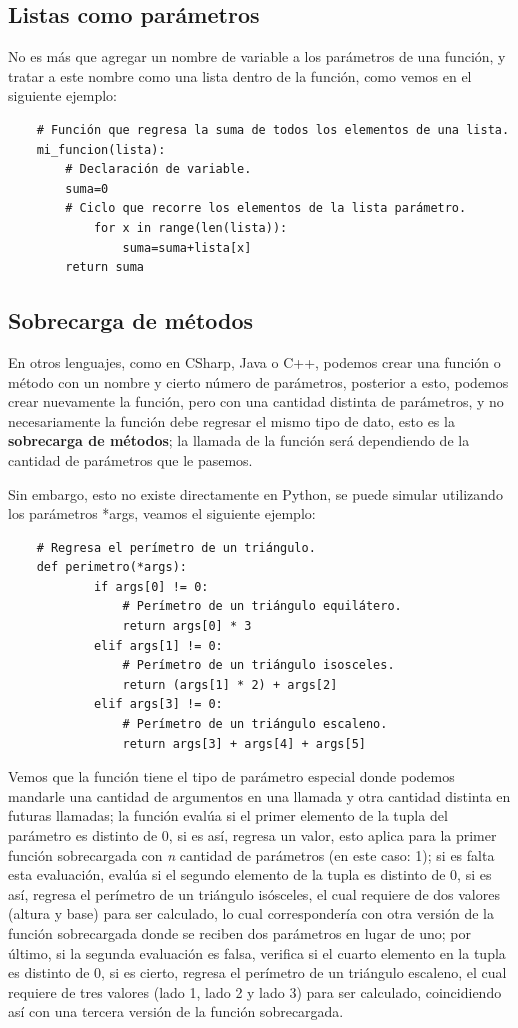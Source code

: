 \subsection{Listas como parámetros}
\hspace{0.55cm}No es más que agregar un nombre de variable a los parámetros de una función, y tratar a este nombre como una lista dentro de la función, como vemos en el siguiente ejemplo:
\begin{lstlisting}
	# Función que regresa la suma de todos los elementos de una lista.
	mi_funcion(lista):
		# Declaración de variable.
		suma=0
		# Ciclo que recorre los elementos de la lista parámetro.
    		for x in range(len(lista)):
        		suma=suma+lista[x]
   		return suma
\end{lstlisting}


\subsection{Sobrecarga de métodos}
\hspace{0.55cm}En otros lenguajes, como en CSharp, Java o C++, podemos crear una función o método con un nombre y cierto número de parámetros, posterior a esto, podemos crear nuevamente la función, pero con una cantidad distinta de parámetros, y no necesariamente la función debe regresar el mismo tipo de dato, esto es la \textbf{sobrecarga de métodos}; la llamada de la función será dependiendo de la cantidad de parámetros que le pasemos.

Sin embargo, esto no existe directamente en Python, se puede simular utilizando los parámetros *args, veamos el siguiente ejemplo:
\begin{lstlisting}
	# Regresa el perímetro de un triángulo.
	def perimetro(*args):
    		if args[0] != 0:
    			# Perímetro de un triángulo equilátero.
        		return args[0] * 3
    		elif args[1] != 0:
    			# Perímetro de un triángulo isosceles.
        		return (args[1] * 2) + args[2]
    		elif args[3] != 0:
    			# Perímetro de un triángulo escaleno.
        		return args[3] + args[4] + args[5]
\end{lstlisting}

Vemos que la función tiene el tipo de parámetro especial donde podemos mandarle una cantidad de argumentos en una llamada y otra cantidad distinta en futuras llamadas; la función evalúa si el primer elemento de la tupla del parámetro es distinto de 0, si es así, regresa un valor, esto aplica para la primer función sobrecargada con \textit{n} cantidad de parámetros (en este caso: 1); si es falta esta evaluación, evalúa si el segundo elemento de la tupla es distinto de 0, si es así, regresa el perímetro de un triángulo isósceles, el cual requiere de dos valores (altura y base) para ser calculado, lo cual correspondería con otra versión de la función sobrecargada donde se reciben dos parámetros en lugar de uno; por último, si la segunda evaluación es falsa, verifica si el cuarto elemento en la tupla es distinto de 0, si es cierto, regresa el perímetro de un triángulo escaleno, el cual requiere de tres valores (lado 1, lado 2 y lado 3) para ser calculado, coincidiendo así con una tercera versión de la función sobrecargada.

